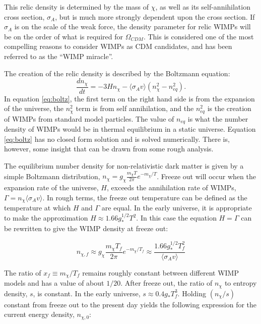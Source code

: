 This relic density is determined by the mass of $\chi$, as well as its self-annihilation cross section, $\sigma_{A}$, but is much more strongly dependent upon the cross section.\cite{susyDM,wimp2} If $\sigma_{A}$ is on the scale of the weak force, the density parameter for relic WIMPs will be on the order of what is required for $\Omega_{CDM}$. This is considered one of the most compelling reasons to consider WIMPs as CDM candidates, and has been referred to as the ``WIMP miracle''\cite{wimp1,wimp2, susyDM}.

The creation of the relic density is described by the Boltzmann equation:
\begin{equation}\label{eq:boltz}
\frac{dn_{\chi}}{dt} = -3Hn_{\chi}- \langle \sigma_{A}v \rangle (n_{\chi}^{2}-n_{eq}^{2}).
\end{equation}
In equation \ref{eq:boltz}, the first term on the right hand side is from the expansion of the universe, the $n_{\chi}^{2}$ term is from self annihilation, and the $n_{eq}^{2}$ is the creation of WIMPs from standard model particles.\cite{susyDM,wimp2} The value of $n_{eq}$ is what the number density of WIMPs would be in thermal equilibrium in a static universe. Equation \ref{eq:boltz} has no closed form solution and is solved numerically. There is, however, some insight that can be drawn from some rough analysis\cite{wimp1,wimp2}.

The equilibrium number density for non-relativistic dark matter is given by a simple Boltzmann distribution, $n_{\chi}=g_{\chi}\frac{m_{\chi} T}{2 \pi}e^{-m_{\chi}/T}$.\cite{wimp1} Freeze out will occur when the expansion rate of the universe, $H$, exceeds the annihilation rate of WIMPs, $\Gamma =  n_{\chi} \langle \sigma_{A}v \rangle $. In rough terms, the freeze out temperature can be defined as the temperature at  which $H$ and $\Gamma$ are equal.\cite{wimp1,wimp2}  In the early universe, it is appropriate to make the approximation $H \approx 1.66 g_{*}^{1/2}T^{2}$\cite{susyDM}. In this case the equation $H=\Gamma$ can be rewritten to give the WIMP density at freeze out:

\begin{equation}\label{eq}
n_{\chi,f}
\approx
g_{\chi}\frac{m_{\chi} T_{f}}{2 \pi}e^{-m_{\chi}/T_{f}} 
\approx 
\frac{1.66 g_{*}^{1/2}T_{f}^{2}}{\langle \sigma_{A}v \rangle }
\end{equation}

The ratio of $x_{f} \equiv m_{\chi}/T_{f}$ remains roughly constant between different WIMP models and has a value of about $1/20$. After freeze out, the ratio of $n_{\chi}$ to entropy density, $s$, is constant. In the early universe, $s \approx 0.4 g_{*}T_f^{3}$. Holding $(n_{\chi}/s)$ constant from freeze out to the present day yields the following expression for the current energy density, $n_{\chi,0}$:

